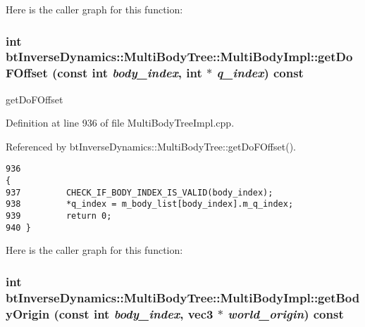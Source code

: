 Here is the caller graph for this function:\hypertarget{classbt_inverse_dynamics_1_1_multi_body_tree_1_1_multi_body_impl_4c00fcbd892f06e452ae3c8a8ffa6f19}{
\subsubsection[getDoFOffset]{\setlength{\rightskip}{0pt plus 5cm}int btInverseDynamics::MultiBodyTree::MultiBodyImpl::getDoFOffset (const int {\em body\_\-index}, \/  int $\ast$ {\em q\_\-index}) const}}
\label{classbt_inverse_dynamics_1_1_multi_body_tree_1_1_multi_body_impl_4c00fcbd892f06e452ae3c8a8ffa6f19}


getDoFOffset 

Definition at line 936 of file MultiBodyTreeImpl.cpp.

Referenced by btInverseDynamics::MultiBodyTree::getDoFOffset().

\begin{Code}\begin{verbatim}936                                                                                      {
937         CHECK_IF_BODY_INDEX_IS_VALID(body_index);
938         *q_index = m_body_list[body_index].m_q_index;
939         return 0;
940 }
\end{verbatim}
\end{Code}




Here is the caller graph for this function:\hypertarget{classbt_inverse_dynamics_1_1_multi_body_tree_1_1_multi_body_impl_efc23817afea0d39e6a3786a6f5ba504}{
\subsubsection[getBodyOrigin]{\setlength{\rightskip}{0pt plus 5cm}int btInverseDynamics::MultiBodyTree::MultiBodyImpl::getBodyOrigin (const int {\em body\_\-index}, \/  {\bf vec3} $\ast$ {\em world\_\-origin}) const}}
\label{classbt_inverse_dynamics_1_1_multi_body_tree_1_1_multi_body_impl_efc23817afea0d39e6a3786a6f5ba504}


